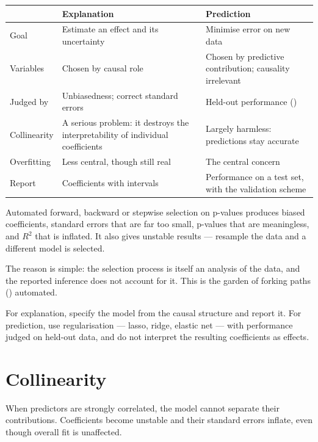\begin{center}
\small
\begin{tabular}{@{}L{3.0cm}L{5.4cm}L{5.9cm}@{}}
\toprule
 & \textbf{Explanation} & \textbf{Prediction} \\
\midrule
Goal        & Estimate an effect and its uncertainty
            & Minimise error on new data \\
Variables   & Chosen by causal role
            & Chosen by predictive contribution; causality irrelevant \\
Judged by   & Unbiasedness; correct standard errors
            & Held-out performance () \\
Collinearity& A serious problem: it destroys the interpretability of individual
              coefficients
            & Largely harmless: predictions stay accurate \\
Overfitting & Less central, though still real
            & The central concern \\
Report      & Coefficients with intervals
            & Performance on a test set, with the validation scheme \\
\bottomrule
\end{tabular}
\end{center}

\begin{alertbox}
Automated forward, backward or stepwise selection on p-values produces biased
coefficients, standard errors that are far too small, p-values that are
meaningless, and $R^2$ that is inflated. It also gives unstable results ---
resample the data and a different model is selected.

\medskip
The reason is simple: the selection process is itself an analysis of the data,
and the reported inference does not account for it. This is the garden of
forking paths () automated.

\medskip
For explanation, specify the model from the causal structure and report it. For
prediction, use regularisation --- lasso, ridge, elastic net --- with
performance judged on held-out data, and do not interpret the resulting
coefficients as effects.
\end{alertbox}

\section{Collinearity}

When predictors are strongly correlated, the model cannot separate their
contributions. Coefficients become unstable and their standard errors inflate,
even though overall fit is unaffected.


